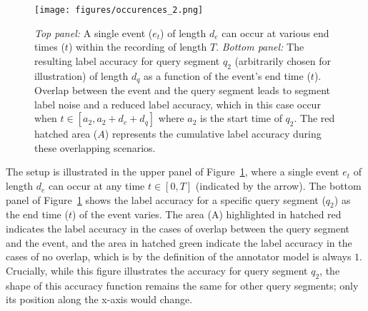\begin{figure}
    \centering
    \texttt{[image: figures/occurences\_2.png]}
    \caption{
    \textit{Top panel:}  A single event ($e_t$) of length $d_e$ can occur at various end times ($t$) within the recording of length $T$. \textit{Bottom panel:} The resulting label accuracy for query segment $q_2$ (arbitrarily chosen for illustration) of length $d_q$ as a function of the event's end time ($t$). Overlap between the event and the query segment leads to segment label noise and a reduced label accuracy, which in this case occur when $t\in[a_2, a_2+d_e+d_q]$ where $a_2$ is the start time of $q_2$. The red hatched area ($A$) represents the cumulative label accuracy during these overlapping scenarios.
    }
    \label{fig:proof_idea}
\end{figure}

The setup is illustrated in the upper panel of Figure~\ref{fig:proof_idea}, where a single event $e_t$ of length $d_e$ can occur at any time $t\in[0, T]$ (indicated by the arrow). The bottom panel of Figure~\ref{fig:proof_idea} shows the label accuracy for a specific query segment ($q_2$) as the end time ($t$) of the event varies. The area (A) highlighted in hatched red indicates the label accuracy in the cases of overlap between the query segment and the event, and the area in hatched green indicate the label accuracy in the cases of no overlap, which is by the definition of the annotator model is always $1$. Crucially, while this figure illustrates the accuracy for query segment $q_2$, the shape of this accuracy function remains the same for other query segments; only its position along the x-axis would change.  %


